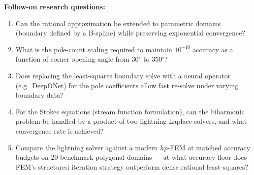\noindent\textbf{Follow-on research questions:}
\begin{enumerate}[leftmargin=1.6em,itemsep=0.2em,topsep=0.2em,label=Q\arabic*.]
\item Can the rational approximation be extended to parametric domains (boundary defined by a B-spline) while preserving exponential convergence?
\item What is the pole-count scaling required to maintain $10^{-10}$ accuracy as a function of corner opening angle from 30$^\circ$ to 350$^\circ$?
\item Does replacing the least-squares boundary solve with a neural operator (e.g.\ DeepONet) for the pole coefficients allow fast re-solve under varying boundary data?
\item For the Stokes equations (stream function formulation), can the biharmonic problem be handled by a product of two lightning-Laplace solvers, and what convergence rate is achieved?
\item Compare the lightning solver against a modern $hp$-FEM at matched accuracy budgets on 20 benchmark polygonal domains --- at what accuracy floor does FEM's structured iteration strategy outperform dense rational least-squares?
\end{enumerate}

